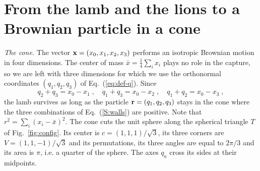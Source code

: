 \section{From the lamb and the lions to a Brownian particle in a cone} \label{S:sec-cone}

\emph{The cone.} The vector $\vb{x} = (x_0, x_1, x_2, x_3)$ performs an isotropic Brownian motion in four dimensions. The center of mass $\bar{x} = \frac{1}{4} \sum_i x_i$ plays no role in the capture, so we are left with three dimensions for which we use the orthonormal coordinates $(q_1, q_2, q_3)$ of Eq.~(\ref{eq:def-q}). Since
\begin{equation} \label{S:walls}
    q_2 + q_3 = x_0 - x_1 \;, \quad q_1 + q_3 = x_0 - x_2 \;, \quad q_1 + q_2 = x_0 - x_3 \;,
\end{equation}
the lamb survives as long as the particle $\vb{r} = (q_1, q_2, q_3)$ stays in the cone where the three combinations of Eq.~(\ref{S:walls}) are positive. Note that $r^2 = \sum_{i} (x_i - \bar{x})^2$. The cone cuts the unit sphere along the spherical triangle $T$ of Fig.~\ref{fig:config}. Its center is $c = (1, 1, 1)/\sqrt{3}$, its three corners are $V = (1, 1, -1)/\sqrt{3}$ and its permutations, its three angles are equal to $2\pi/3$ and its area is $\pi$, i.e. a quarter of the sphere. The axes $q_a$ cross its sides at their midpoints.

